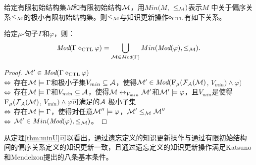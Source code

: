 给定有限初始结构集$M$和有限初始结构${\cal M}$，用$Min(M,$ $\leq_{{\cal M}})$表示$M$ 中关于偏序关系$\leq_{{\cal M}}$的极小有限初始结构集。则$\leq_{{\cal M}}$与知识更新操作$\diamond_{\textrm{CTL}}$有如下关系。

\begin{theorem}\label{thm:minU}
	给定$\mu$-句子$\Gamma$和$\varphi$，则：
	\[\textit{Mod}(\Gamma \diamond_{\textrm{CTL}} \varphi) = \bigcup_{{\cal M}\in \textit{Mod}(\Gamma)} Min(\textit{Mod}(\varphi), \leq_{{\cal M}}).
	\]
\end{theorem}
\begin{proof}
	${\cal M}'\in \textit{Mod}(\Gamma \diamond_{\textrm{CTL}} \varphi)$\\
	$\Leftrightarrow$ 存在${\cal M} \models \Gamma$和极小子集$V_{min} \subseteq {\cal A}$，使得${\cal M}' \in \textit{Mod}({\textsc{F}_{\textsc{$\mu$}}}({\cal F}_{{\cal A}}({\cal M})$, $V_{min}) \wedge \varphi)$\\
	$\Leftrightarrow$ 存在${\cal M} \models \Gamma$和$V_{min}\subseteq {\cal A}$，使得${\cal M} \leftrightarrow_{V_{min}} {\cal M}'$和${\cal M}' \models \varphi$，且$V_{min}$是使得${\textsc{F}_{\textsc{$\mu$}}}({\cal F}_{{\cal A}}({\cal M})$, $V_{min}) \wedge \varphi$可满足的${\cal A}$ 极小子集\\
	$\Leftrightarrow$ 存在${\cal M} \models \Gamma$，使得对任意${\cal M}''\models \varphi$，${\cal M}' \leq_{{\cal M}} {\cal M}''$\\
	$\Leftrightarrow$ ${\cal M}' \in Min(\textit{Mod}(\varphi), \leq_{{\cal M}})$。
\end{proof}


从定理\ref{thm:minU}可以看出，通过遗忘定义的知识更新操作与通过有限初始结构间的偏序关系定义的知识更新一致，且通过遗忘定义的知识更新操作满足Katsuno和Mendelzon提出的八条基本条件。

